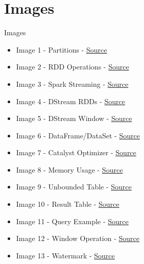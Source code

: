 \documentclass{beamer}
\begin{document}
\section*{Images}
\begin{frame}
Images
\begin{itemize}
	\item Image 1 - Partitions - \href{https://towardsdata.dev/apache-spark/2022/spark-bucketing-and-partitions}{Source}
	\item Image 2 - RDD Operations - \href{https://medium.com/analytics-vidhya/spark-rdd-low-level-api-basics-using-pyspark-a9a322b58f6}{Source}
	\item Image 3 - Spark Streaming - \href{https://spark.apache.org/docs/latest/streaming-programming-guide.html}{Source}
	\item Image 4 - DStream RDDs - \href{https://spark.apache.org/docs/latest/streaming-programming-guide.html}{Source}
	\item Image 5 - DStream Window - \href{https://spark.apache.org/docs/latest/streaming-programming-guide.html}{Source}
	\item Image 6 - DataFrame/DataSet - \href{https://www.databricks.com/blog/2016/07/14/a-tale-of-three-apache-spark-apis-rdds-dataframes-and-datasets.html}{Source}
	\item Image 7 - Catalyst Optimizer - \href{https://www.databricks.com/glossary/catalyst-optimizer}{Source}
	\item Image 8 - Memory Usage - \href{https://www.databricks.com/blog/2016/07/14/a-tale-of-three-apache-spark-apis-rdds-dataframes-and-datasets.html}{Source}
	\item Image 9 - Unbounded Table - \href{https://spark.apache.org/docs/latest/structured-streaming-programming-guide.html}{Source}
	\item Image 10 - Result Table - \href{https://spark.apache.org/docs/latest/structured-streaming-programming-guide.html}{Source}
	\item Image 11 - Query Example - \href{https://spark.apache.org/docs/latest/structured-streaming-programming-guide.html}{Source}
	\item Image 12 - Window Operation - \href{https://spark.apache.org/docs/latest/structured-streaming-programming-guide.html}{Source}
	\item Image 13 - Watermark - \href{https://spark.apache.org/docs/latest/structured-streaming-programming-guide.html}{Source}
\end{itemize}
\end{frame}
\end{document}
